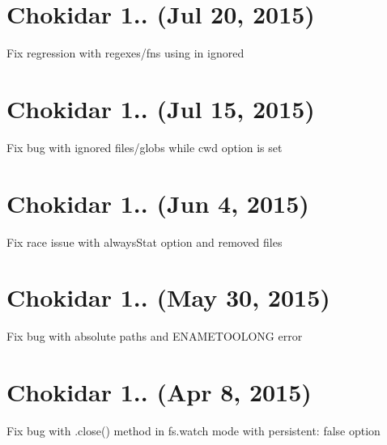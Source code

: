 \section*{Chokidar 1.. (Jul 20, 2015)}


\begin{DoxyItemize}
\item Fix regression with regexes/fns using in {\ttfamily ignored}
\end{DoxyItemize}

\section*{Chokidar 1.. (Jul 15, 2015)}


\begin{DoxyItemize}
\item Fix bug with {\ttfamily ignored} files/globs while {\ttfamily cwd} option is set
\end{DoxyItemize}

\section*{Chokidar 1.. (Jun 4, 2015)}


\begin{DoxyItemize}
\item Fix race issue with {\ttfamily always\+Stat} option and removed files
\end{DoxyItemize}

\section*{Chokidar 1.. (May 30, 2015)}


\begin{DoxyItemize}
\item Fix bug with absolute paths and E\+N\+A\+M\+E\+T\+O\+O\+L\+O\+NG error
\end{DoxyItemize}

\section*{Chokidar 1.. (Apr 8, 2015)}


\begin{DoxyItemize}
\item Fix bug with {\ttfamily .close()} method in {\ttfamily fs.\+watch} mode with {\ttfamily persistent\+: false} option
\end{DoxyItemize}

